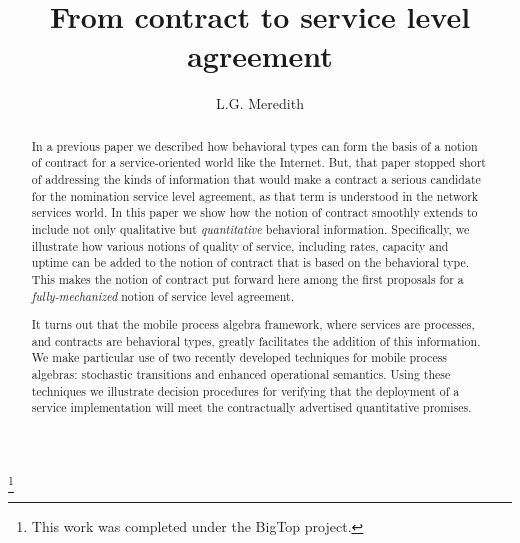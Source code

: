 \documentclass{amsart}
\theoremstyle{definition}
\theoremstyle{remark}
\numberwithin{equation}{subsection}
\newcommand{\papertitle}{From contract to service level agreement}
\begin{document}
\setlength{\topmargin}{0in}
\setlength{\textheight}{8.5in}
\setlength{\parskip}{6pt}

\title{\huge{\papertitle}}

\author{ L.G. Meredith }



\thanks{This work was completed under the BigTop project.}




\dedicatory{}



\begin{abstract}
\normalsize{ 

In a previous paper we described how behavioral types can form the
basis of a notion of contract for a service-oriented world like the
Internet. But, that paper stopped short of addressing the kinds of
information that would make a contract a serious candidate for the
nomination service level agreement, as that term is understood in the
network services world. In this paper we show how the notion of
contract smoothly extends to include not only qualitative but
\emph{quantitative} behavioral information. Specifically, we
illustrate how various notions of quality of service, including rates,
capacity and uptime can be added to the notion of contract that is
based on the behavioral type. This makes the notion of contract put
forward here among the first proposals for a \emph{fully-mechanized}
notion of service level agreement.

It turns out that the mobile process algebra framework, where services
are processes, and contracts are behavioral types, greatly facilitates
the addition of this information. We make particular use of two
recently developed techniques for mobile process algebras: stochastic
transitions and enhanced operational semantics. Using these techniques
we illustrate decision procedures for verifying that the deployment of
a service implementation will meet the contractually advertised
quantitative promises.

}
\end{abstract}
\end{document}
